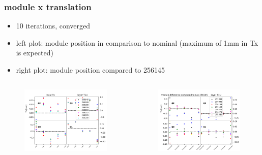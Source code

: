 \documentclass[aspectratio=1610, 12pt]{beamer}
\begin{document}
\begin{frame}\frametitle{module x translation}
  \begin{itemize}
    \item 10 iterations, converged
    \item left plot: module position in comparison to nominal (maximum of 1mm in Tx is expected)
    \item right plot: module position compared to 256145
  \end{itemize}
  \begin{columns}
    \begin{column}[c]{0.48\textwidth}
      \begin{figure}
        \includegraphics[width=\textwidth]{plots/relative_pos/tx_all_runs_T1U.pdf}
      \end{figure}
    \end{column}
    \begin{column}[c]{0.48\textwidth}
      \begin{figure}
        \includegraphics[width=\textwidth]{plots/outfiles_comparison/diff_runs_diff_plots_T1U.pdf}
      \end{figure}
    \end{column}
  \end{columns}
\end{frame}
\end{document}
